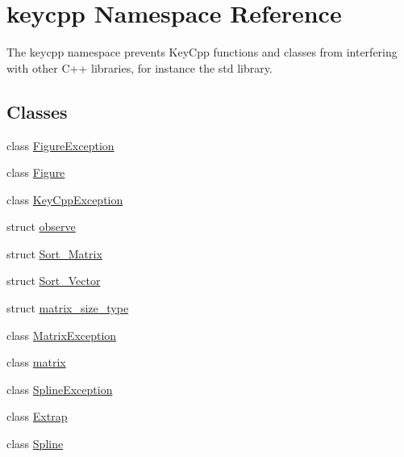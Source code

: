 \hypertarget{namespacekeycpp}{\section{keycpp Namespace Reference}
\label{namespacekeycpp}
}


The keycpp namespace prevents Key\-Cpp functions and classes from interfering with other C++ libraries, for instance the std library.  


\subsection*{Classes}
\begin{DoxyCompactItemize}
\item 
class \hyperlink{classkeycpp_1_1_figure_exception}{Figure\-Exception}
\item 
class \hyperlink{classkeycpp_1_1_figure}{Figure}
\item 
class \hyperlink{classkeycpp_1_1_key_cpp_exception}{Key\-Cpp\-Exception}
\item 
struct \hyperlink{structkeycpp_1_1observe}{observe}
\item 
struct \hyperlink{structkeycpp_1_1_sort___matrix}{Sort\-\_\-\-Matrix}
\item 
struct \hyperlink{structkeycpp_1_1_sort___vector}{Sort\-\_\-\-Vector}
\item 
struct \hyperlink{structkeycpp_1_1matrix__size__type}{matrix\-\_\-size\-\_\-type}
\item 
class \hyperlink{classkeycpp_1_1_matrix_exception}{Matrix\-Exception}
\item 
class \hyperlink{classkeycpp_1_1matrix}{matrix}
\item 
class \hyperlink{classkeycpp_1_1_spline_exception}{Spline\-Exception}
\item 
class \hyperlink{classkeycpp_1_1_extrap}{Extrap}
\item 
class \hyperlink{classkeycpp_1_1_spline}{Spline}
\end{DoxyCompactItemize}
